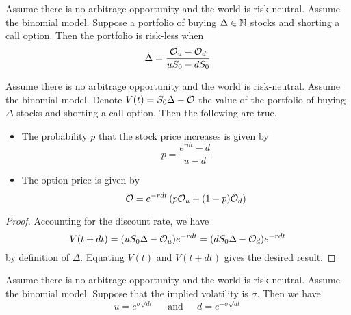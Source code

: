 \documentclass[a4paper]{article}
\begin{document}
\begin{lmm}{}{} Assume there is no arbitrage opportunity and the world is risk-neutral. Assume the binomial model. Suppose a portfolio of buying $\Delta\in\mathbb{N}$ stocks and shorting a call option. Then the portfolio is risk-less when $$\Delta=\frac{\mathcal{O}_u-\mathcal{O}_d}{uS_0-dS_0}$$
\end{lmm}

\begin{prp}{}{} Assume there is no arbitrage opportunity and the world is risk-neutral. Assume the binomial model. Denote $V(t)=S_0\Delta-\mathcal{O}$ the value of the portfolio of buying $\Delta$ stocks and shorting a call option. Then the following are true. 
\begin{itemize}
\item The probability $p$ that the stock price increases is given by $$p=\frac{e^{rdt}-d}{u-d}$$
\item The option price is given by $$\mathcal{O}=e^{-rdt}\left(p\mathcal{O}_u+(1-p)\mathcal{O}_d\right)$$
\end{itemize} \tcbline
\begin{proof}
Accounting for the discount rate, we have $$V(t+dt)=(uS_0\Delta-\mathcal{O}_u)e^{-rdt}=(dS_0\Delta-\mathcal{O}_d)e^{-rdt}$$ by definition of $\Delta$. Equating $V(t)$ and $V(t+dt)$ gives the desired result. 
\end{proof}
\end{prp}

\begin{lmm}{}{} Assume there is no arbitrage opportunity and the world is risk-neutral. Assume the binomial model. Suppose that the implied volatility is $\sigma$. Then we have $$u=e^{\sigma\sqrt{dt}}\;\;\;\;\text{ and }\;\;\;\;d=e^{-\sigma\sqrt{dt}}$$
\end{lmm}
\end{document}
